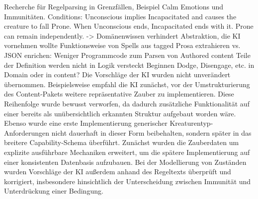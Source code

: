 Recherche für Regelparsing in Grenzfällen, Beispiel Calm Emotions und Immunitäten.\markdownRendererOlItemEnd 
{}Conditions:\markdownRendererOlItemEnd 
\markdownRendererOlEndTight \markdownRendererInterblockSeparator
{}\markdownRendererUlBeginTight
\markdownRendererUlItem Unconscious implies Incapacitated and causes the creature to fall Prone.\markdownRendererUlItemEnd 
\markdownRendererUlItem When Unconscious ends, Incapacitated ends with it.\markdownRendererUlItemEnd 
\markdownRendererUlItem Prone can remain independently.\markdownRendererSoftLineBreak
{}-> Domänenwissen verhindert Abstraktion, die KI vornehmen wollte\markdownRendererUlItemEnd 
\markdownRendererUlEndTight \markdownRendererInterblockSeparator
{}\markdownRendererOlBeginTight
{}Funktionsweise von Spells aus tagged Prosa extrahieren vs. JSON enrichen:\markdownRendererOlItemEnd 
\markdownRendererOlEndTight \markdownRendererInterblockSeparator
{}\markdownRendererUlBeginTight
\markdownRendererUlItem Weniger Programmcode zum Parsen von Authored content\markdownRendererUlItemEnd 
\markdownRendererUlItem Teile der Definition werden nicht in Logik versteckt\markdownRendererUlItemEnd 
\markdownRendererUlEndTight \markdownRendererInterblockSeparator
{}\markdownRendererOlBeginTight
{}Beginnen Dodge, Disengage, etc. in Domain oder in content?\markdownRendererOlItemEnd 
\markdownRendererOlEndTight \markdownRendererInterblockSeparator
{}Die Vorschläge der KI wurden nicht unverändert übernommen. Beispielsweise empfahl die KI zunächst, vor der Umstrukturierung des Content-Pakets weitere repräsentative Zauber zu implementieren. Diese Reihenfolge wurde bewusst verworfen, da dadurch zusätzliche Funktionalität auf einer bereits als unübersichtlich erkannten Struktur aufgebaut worden wäre. Ebenso wurde eine erste Implementierung generischer Kreaturentyp-Anforderungen nicht dauerhaft in dieser Form beibehalten, sondern später in das breitere Capability-Schema überführt. Zunächst wurden die Zauberdaten um explizite ausführbare Mechaniken erweitert, um die spätere Implementierung auf einer konsistenten Datenbasis aufzubauen. Bei der Modellierung von Zuständen wurden Vorschläge der KI außerdem anhand des Regeltexts überprüft und korrigiert, insbesondere hinsichtlich der Unterscheidung zwischen Immunität und Unterdrückung einer Bedingung.\markdownRendererParagraphSeparator
{}\markdownRendererInterblockSeparator
